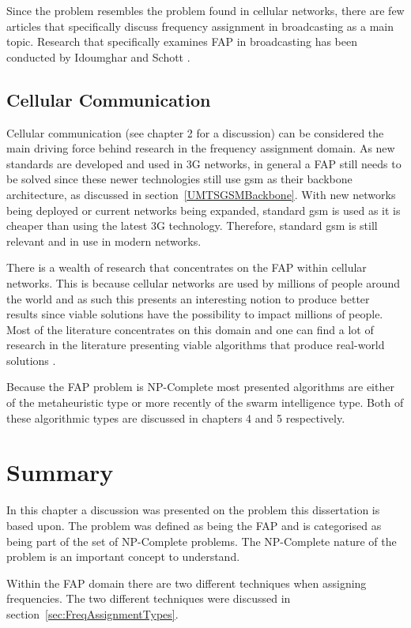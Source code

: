 Since the problem resembles the problem found in cellular networks, there are few articles that specifically discuss frequency assignment in broadcasting as a main topic. Research that specifically examines \gls{FAP} in broadcasting has been conducted by Idoumghar and Schott \cite{RadioFAP}.
\subsection{Cellular Communication}
Cellular communication (see chapter 2 for a discussion) can be considered the main driving force behind research in the frequency assignment domain. As new standards are developed and used in 3G networks, in general a \gls{FAP} still needs to be solved since these newer technologies still use \gls{gsm} as their backbone architecture, as discussed in section~\ref{UMTSGSMBackbone}. With new networks being deployed or current networks being expanded, standard \gls{gsm} is used as it is cheaper than using the latest 3G technology. Therefore, standard \gls{gsm} is still relevant and in use in modern networks.

There is a wealth of research that concentrates on the \gls{FAP} within cellular networks. This is because cellular networks are used by millions of people around the world and as such this presents an interesting notion to produce better results since viable solutions have the possibility to impact millions of people. Most of the literature concentrates on this domain and one can find a lot of research in the literature presenting viable algorithms that produce real-world solutions \cite{Eisenblatter}. 

Because the \gls{FAP} problem is NP-Complete most presented algorithms are either of the metaheuristic type or more recently of the swarm intelligence type. Both of these algorithmic types are discussed in chapters 4 and 5 respectively.
\section{Summary}
In this chapter a discussion was presented on the problem this dissertation is based upon. The problem was defined as being the \gls{FAP} and is categorised as being part of the set of NP-Complete problems. The NP-Complete nature of the problem is an important concept to understand.

Within the \gls{FAP} domain there are two different techniques when assigning frequencies. The two different techniques were discussed in section~\ref{sec:FreqAssignmentTypes}. 

